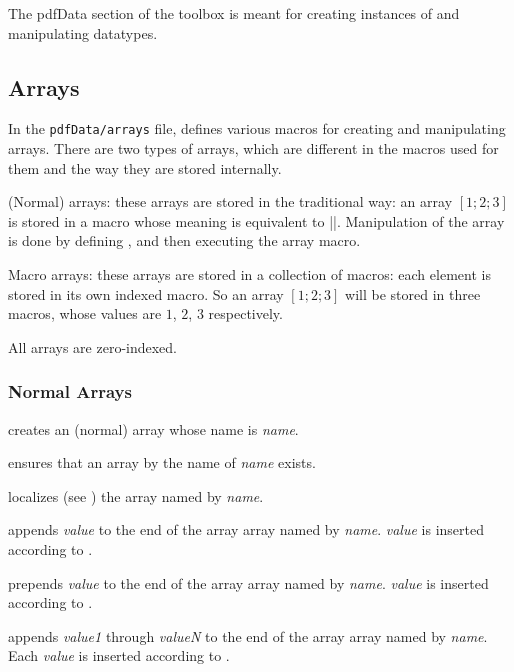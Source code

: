The pdfData section of the \pdftoolbox{} toolbox is meant for creating instances of and manipulating datatypes.

\subsection{Arrays}

In the {\tt pdfData/arrays} file, \pdftoolbox{} defines various macros for creating and manipulating arrays.
There are two types of arrays, which are different in the macros used for them and the way they are stored internally.
\blist
    \item (Normal) arrays: these arrays are stored in the traditional way: an array $[1;2;3]$ is stored in a macro whose meaning is equivalent to \inlinecode||.
    Manipulation of the array is done by defining \macro\X, and then executing the array macro.
    \item Macro arrays: these arrays are stored in a collection of macros: each element is stored in its own indexed macro.
    So an array $[1;2;3]$ will be stored in three macros, whose values are $1$, $2$, $3$ respectively.
\elist

\bnote

    All arrays are zero-indexed.

\eppbox

\subsubsection{Normal Arrays}

creates an (normal) array whose name is {\it name}.
\emacroexp

ensures that an array by the name of {\it name} exists.
\emacroexp

localizes (see ) the array named by {\it name}.
\emacroexp

appends {\it value} to the end of the array array named by {\it name}.
{\it value} is inserted according to \gotomacro\currdef.
\emacroexp

prepends {\it value} to the end of the array array named by {\it name}.
{\it value} is inserted according to \gotomacro\currdef.
\emacroexp

appends {\it value1} through {\it valueN} to the end of the array array named by {\it name}.
Each {\it value} is inserted according to \gotomacro\currdef.
\emacroexp

